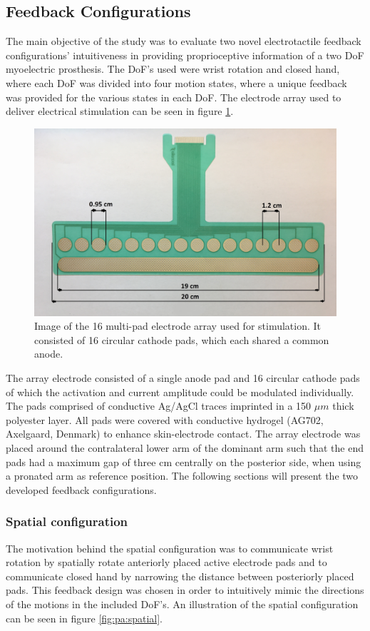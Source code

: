 \subsection{Feedback Configurations}
The main objective of the study was to evaluate two novel electrotactile feedback configurations' intuitiveness in providing proprioceptive information of a two DoF myoelectric prosthesis. 
The DoF's used were wrist rotation and closed hand, where each DoF was divided into four motion states, where a unique feedback was provided for the various states in each DoF. The electrode array used to deliver electrical stimulation can be seen in figure \ref{fig:pa:electrode}.
\begin{figure}[H]                 
	\includegraphics[width=.95\textwidth]{figures/electrode}  
	\caption{Image of the 16 multi-pad electrode array used for stimulation. It consisted of 16 circular cathode pads, which each shared a common anode.}
	\label{fig:pa:electrode} 
\end{figure}
The array electrode consisted of a single anode pad and 16 circular cathode pads of which the activation and current amplitude could be modulated individually. The pads comprised of conductive Ag/AgCl traces imprinted in a 150 $\mu m$ thick polyester layer. All pads were covered with conductive hydrogel (AG702, Axelgaard, Denmark) to enhance skin-electrode contact. The array electrode was placed around the contralateral lower arm of the dominant arm such that the end pads had a maximum gap of three cm centrally on the posterior side, when using a pronated arm as reference position. The following sections will present the two developed feedback configurations. 


\subsubsection{Spatial configuration}
The motivation behind the spatial configuration was to communicate wrist rotation by spatially rotate anteriorly placed active electrode pads and to communicate closed hand by narrowing the distance between posteriorly placed pads. 
This feedback design was chosen in order to intuitively mimic the directions of the motions in the included DoF's. An illustration of the spatial configuration can be seen in figure \ref{fig:pa:spatial}. 

